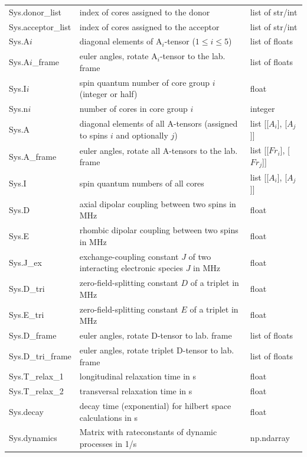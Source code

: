 \documentclass[a4paper,12pt]{scrartcl}
\begin{document}
\begin{xltabular}{\linewidth}{lXl}
Sys.donor\_list & index of cores assigned to the donor & list of str/int\\
Sys.acceptor\_list & index of cores assigned to the acceptor & list of str/int\\
Sys.A$i$ & diagonal elements of A$_i$-tensor ($1\leq i \leq 5$)  & list of floats\\
Sys.A$i$\_frame & euler angles, rotate A$_i$-tensor to the lab. frame & list of floats\\
Sys.I$i$ & spin quantum number of core group $i$ (integer or half) & float  \\
Sys.n$i$ & number of cores in core group $i$ & integer \\
Sys.A & diagonal elements of all A-tensors (assigned to spins $i$ and optionally $j$) & list [[$A_i$], [$A_j$]]\\
Sys.A\_frame & euler angles, rotate all A-tensors to the lab. frame & list [[$Fr_i$], [$Fr_j$]]\\
Sys.I & spin quantum numbers of all cores & list [[$A_i$], [$A_j$]] \\

\midrule

Sys.D & axial dipolar coupling between two spins in MHz & float\\
Sys.E & rhombic dipolar coupling between two spins in MHz & float\\
Sys.J\_ex & exchange-coupling constant $J$ of two interacting electronic species $J$ in MHz & float\\
Sys.D\_tri & zero-field-splitting constant $D$ of a triplet in MHz & float\\
Sys.E\_tri & zero-field-splitting constant $E$ of a triplet in MHz & float\\
Sys.D\_frame & euler angles, rotate D-tensor to lab. frame & list of floats\\
Sys.D\_tri\_frame & euler angles, rotate triplet D-tensor to lab. frame & list of floats\\

\midrule

Sys.T\_relax\_1 & longitudinal relaxation time in s & float\\
Sys.T\_relax\_2 & transversal relaxation time  in s& float\\
Sys.decay & decay time (exponential) for hilbert space calculations in s & float\\
Sys.dynamics & Matrix with rateconstants of dynamic processes in 1/s & np.ndarray\\


\end{xltabular}
\end{document}
